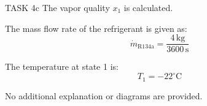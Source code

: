 TASK 4c  
The vapor quality \( x_1 \) is calculated.  

The mass flow rate of the refrigerant is given as:  
\[
\dot{m}_{\text{R134a}} = \frac{4 \, \text{kg}}{3600 \, \text{s}}
\]  

The temperature at state 1 is:  
\[
T_1 = -22^\circ\text{C}
\]  

No additional explanation or diagrams are provided.